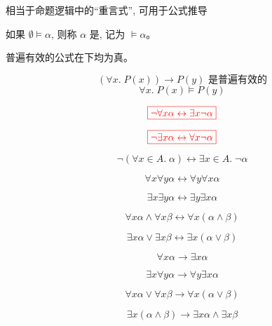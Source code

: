 \begin{frame}{}
  \begin{center}
    相当于命题逻辑中的``重言式'', 可用于公式推导
  \end{center}

  \begin{definition}
    如果 $\emptyset \models \alpha$, 则称 $\alpha$ 是,
    记为 $\models \alpha$。
  \end{definition}

  \pause
  \vspace{0.60cm}
  \begin{center}
    普遍有效的公式在下均为真。

    \[
      (\forall x.\; P(x)) \to P(y) \text{ 是普遍有效的}
    \]
    \[
      \forall x.\; P(x) \models P(y)
    \]
  \end{center}
\end{frame}

\begin{frame}{}
  \[
    \textcolor{red}{\boxed{\lnot \forall x \alpha \leftrightarrow \exists x \lnot \alpha}}
  \]

  \[
    \textcolor{red}{\boxed{\lnot \exists x \alpha \leftrightarrow \forall x \lnot \alpha}}
  \]

  \[
    \lnot (\forall x \in A.\; \alpha) \leftrightarrow \exists x \in A.\; \lnot \alpha
  \]
\end{frame}

\begin{frame}{}
  \[
    \forall x \forall y \alpha \leftrightarrow \forall y \forall x \alpha
  \]

  \[
    \exists x \exists y \alpha \leftrightarrow \exists y \exists x \alpha
  \]
\end{frame}

\begin{frame}{}
  \[
    \forall x \alpha \land \forall x \beta
      \leftrightarrow \forall x (\alpha \land \beta)
  \]

  \[
    \exists x \alpha \lor \exists x \beta
      \leftrightarrow \exists x (\alpha \lor \beta)
  \]
\end{frame}

\begin{frame}{}
  \[
    \forall x \alpha \to \exists x \alpha
  \]

  \[
    \exists x \forall y \alpha \to \forall y \exists x \alpha
  \]

  \pause
  \[
    \forall x \alpha \lor \forall x \beta \to \forall x (\alpha \lor \beta)
  \]

  \[
    \exists x (\alpha \land \beta) \to \exists x \alpha \land \exists x \beta
  \]
\end{frame}

